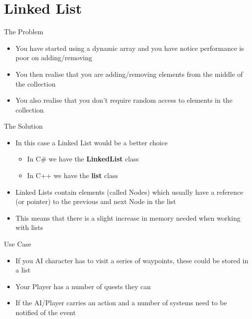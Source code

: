 \part{Linked List}
\frame{\partpage}

\begin{frame}{The Problem}
	\begin{itemize}
		\pause \item You have started using a dynamic array and you have notice performance is poor on adding/removing
		 \pause \item You then realise that you are adding/removing elements from the middle of the collection
		 \pause \item You also realise that you don't require random access to elements in the collection
	\end{itemize}
\end{frame}

\begin{frame}{The Solution}
	\begin{itemize}
		\pause \item In this case a Linked List would be a better choice
		\begin{itemize}
			\pause \item In C\# we have the \textbf{LinkedList} class
			\pause \item In C++ we have the \textbf{list} class
		\end{itemize}
		\pause \item Linked Lists contain elements (called Nodes) which usually have a reference (or pointer) to the previous and next Node in the list
		\pause \item This means that there is a slight increase in memory needed when working with lists
	\end{itemize}
\end{frame}

\begin{frame}{Use Case}
	\begin{itemize}
		\pause \item If you AI character has to visit a series of waypoints, these could be stored in a list
		\pause \item Your Player has a number of quests they can
		\pause \item If the AI/Player carries an action and a number of systems need to be notified of the event 
	\end{itemize}
\end{frame}

